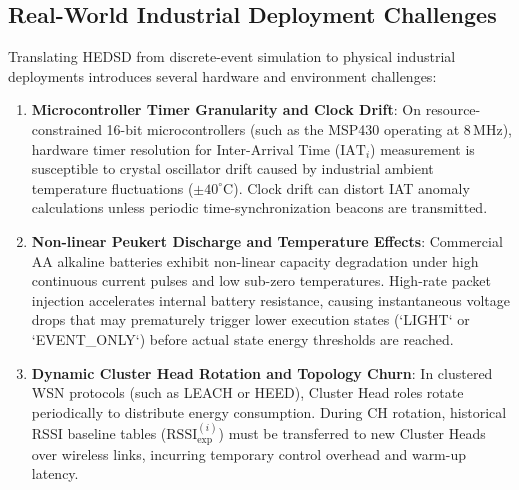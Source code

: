 \documentclass[conference]{IEEEtran}
\begin{document}
\subsection{Real-World Industrial Deployment Challenges}
Translating HEDSD from discrete-event simulation to physical industrial deployments introduces several hardware and environment challenges:
\begin{enumerate}
    \item \textbf{Microcontroller Timer Granularity and Clock Drift}: On resource-constrained 16-bit microcontrollers (such as the MSP430 operating at $8\,\text{MHz}$), hardware timer resolution for Inter-Arrival Time ($\text{IAT}_i$) measurement is susceptible to crystal oscillator drift caused by industrial ambient temperature fluctuations ($\pm 40^\circ\text{C}$). Clock drift can distort IAT anomaly calculations unless periodic time-synchronization beacons are transmitted.
    \item \textbf{Non-linear Peukert Discharge and Temperature Effects}: Commercial AA alkaline batteries exhibit non-linear capacity degradation under high continuous current pulses and low sub-zero temperatures. High-rate packet injection accelerates internal battery resistance, causing instantaneous voltage drops that may prematurely trigger lower execution states (`LIGHT` or `EVENT\_ONLY`) before actual state energy thresholds are reached.
    \item \textbf{Dynamic Cluster Head Rotation and Topology Churn}: In clustered WSN protocols (such as LEACH or HEED), Cluster Head roles rotate periodically to distribute energy consumption. During CH rotation, historical RSSI baseline tables ($\text{RSSI}_{\text{exp}}^{(i)}$) must be transferred to new Cluster Heads over wireless links, incurring temporary control overhead and warm-up latency.
\end{enumerate}
\end{document}
